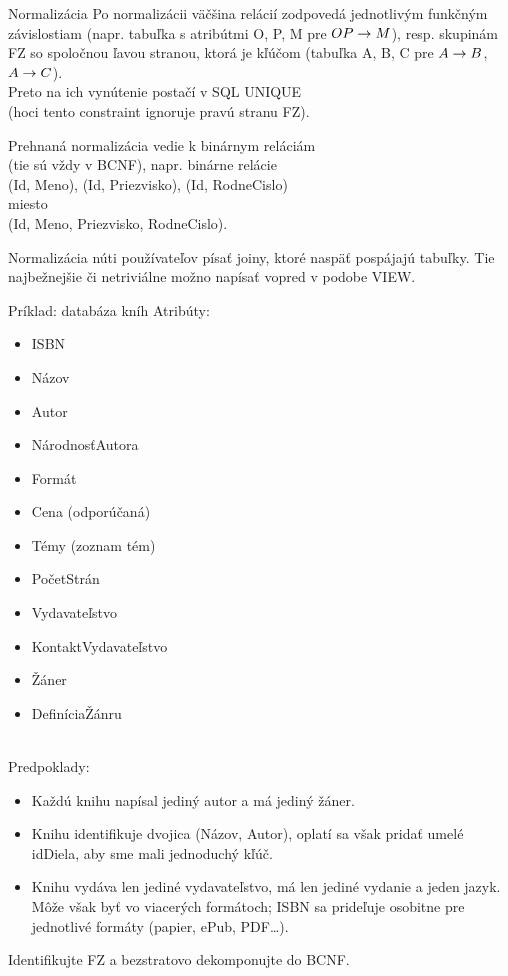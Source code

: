 \documentclass[12pt]{beamer}
\begin{document}
\begin{frame}[fragile]{Normalizácia}
Po normalizácii väčšina relácií zodpovedá jednotlivým funkčným závislostiam (napr. tabuľka s atribútmi O, P, M pre $OP\rightarrow M$),
resp. skupinám FZ so spoločnou ľavou stranou, ktorá je kľúčom (tabuľka A, B, C pre $A\rightarrow B$, $A\rightarrow C$).\\
Preto na ich vynútenie postačí v SQL UNIQUE\\
(hoci tento constraint ignoruje pravú stranu FZ).
\bigskip

Prehnaná normalizácia vedie k binárnym reláciám\\
(tie sú vždy v BCNF), napr. binárne relácie\\
(Id, Meno), (Id, Priezvisko), (Id, RodneCislo)\\
miesto\\
(Id, Meno, Priezvisko, RodneCislo).
\bigskip

Normalizácia núti používateľov písať joiny, ktoré naspäť pospájajú tabuľky.
Tie najbežnejšie či netriviálne možno napísať vopred v podobe VIEW.
\end{frame}

\begin{frame}[fragile]{Príklad: databáza kníh}
Atribúty:\\[3mm]
\begin{minipage}{.4\pdfpagewidth}
\scriptsize
\begin{itemize}
\item ISBN
\item Názov
\item Autor
\item NárodnosťAutora
\item Formát
\item Cena (odporúčaná)
\end{itemize}
\end{minipage}
\begin{minipage}{.4\pdfpagewidth}
\scriptsize
\begin{itemize}
\item Témy (zoznam tém)
\item PočetStrán
\item Vydavateľstvo
\item KontaktVydavateľstvo
\item Žáner
\item DefiníciaŽánru
\end{itemize}
\end{minipage}
\\[3mm]
Predpoklady:
{
\footnotesize
\begin{itemize}
\item Každú knihu napísal jediný autor a má jediný žáner.
\item Knihu identifikuje dvojica (Názov, Autor), oplatí sa však pridať umelé idDiela, aby sme mali jednoduchý kľúč.
\item Knihu vydáva len jediné vydavateľstvo, má len jediné vydanie a jeden jazyk.
    Môže však byť vo viacerých formátoch; ISBN sa prideľuje osobitne pre jednotlivé formáty (papier, ePub, PDF\dots).
\end{itemize}
}
Identifikujte FZ a bezstratovo dekomponujte do BCNF.
\end{frame}
\end{document}
